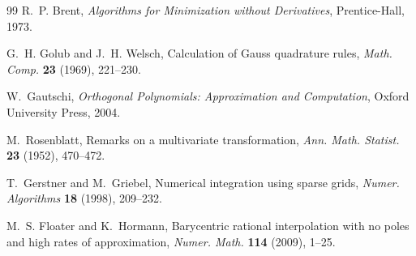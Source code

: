 \documentclass[11pt,a4paper]{article}
\begin{document}
\begin{thebibliography}{99}
R.~P. Brent, \emph{Algorithms for Minimization without Derivatives}, Prentice-Hall, 1973.

G.~H. Golub and J.~H. Welsch, Calculation of Gauss quadrature rules, \emph{Math. Comp.} \textbf{23} (1969), 221--230.

W.~Gautschi, \emph{Orthogonal Polynomials: Approximation and Computation}, Oxford University Press, 2004.

M.~Rosenblatt, Remarks on a multivariate transformation, \emph{Ann. Math. Statist.} \textbf{23} (1952), 470--472.

T.~Gerstner and M.~Griebel, Numerical integration using sparse grids, \emph{Numer. Algorithms} \textbf{18} (1998), 209--232.

M.~S. Floater and K.~Hormann, Barycentric rational interpolation with no poles and high rates of approximation, \emph{Numer. Math.} \textbf{114} (2009), 1--25.
\end{thebibliography}
\end{document}
